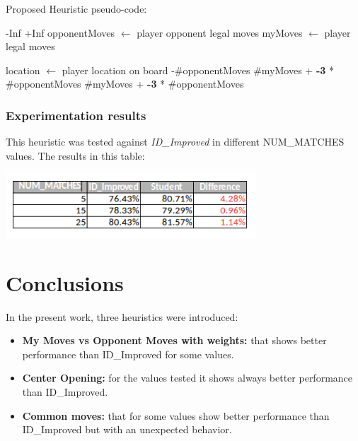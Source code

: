 \documentclass[10pt, a4paper,english]{article}
\begin{document}
Proposed Heuristic pseudo-code:\\

\begin{algorithmic}
    \State\Return -Inf
\EndIf    
{}
   \State \Return +Inf
\Else
    \State opponentMoves $\leftarrow$ player opponent legal moves
  	\State myMoves $\leftarrow$ player legal moves
    
		\State location $\leftarrow$ player location on board
        	\State{}-\#opponentMoves
        \Else
        	\State\Return \#myMoves + \textbf{-3} * \#opponentMoves
        \EndIf
    \Else
    	\State\Return \#myMoves + \textbf{-3} * \#opponentMoves
	\EndIf
\EndIf
\EndFunction
\end{algorithmic}


\subsubsection{Experimentation results}

This heuristic was tested against \textit{ID\_Improved} in different NUM\_MATCHES values. The results in this table:\\

\begin{center}
\includegraphics[width=0.7\textwidth]{results.png}\\
\end{center}

\section{Conclusions}

In the present work, three heuristics were introduced:

\begin{itemize}
\item \textbf{My Moves vs Opponent Moves with weights:} that shows better performance than ID\_Improved for some values. 
\item \textbf{Center Opening:} for the values tested it shows always better performance than ID\_Improved.
\item \textbf{Common moves:} that for some values show better performance than ID\_Improved but with an unexpected behavior.
\end{itemize}
\end{document}
